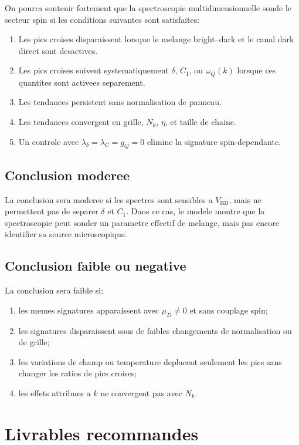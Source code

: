 \documentclass[11pt]{article}
\begin{document}
On pourra soutenir fortement que la spectroscopie multidimensionnelle sonde le secteur spin si les conditions suivantes sont satisfaites:
\begin{enumerate}
    \item Les pics croises disparaissent lorsque le melange bright--dark et le canal dark direct sont desactives.
    \item Les pics croises suivent systematiquement \(\delta\), \(C_1\), ou \(\omega_Q(k)\) lorsque ces quantites sont activees separement.
    \item Les tendances persistent sans normalisation de panneau.
    \item Les tendances convergent en grille, \(N_k\), \(\eta\), et taille de chaine.
    \item Un controle avec \(\lambda_\delta=\lambda_C=g_Q=0\) elimine la signature spin-dependante.
\end{enumerate}

\subsection{Conclusion moderee}

La conclusion sera moderee si les spectres sont sensibles a \(V_{\mathrm{BD}}\), mais ne permettent pas de separer \(\delta\) et \(C_1\). Dans ce cas, le modele montre que la spectroscopie peut sonder un parametre effectif de melange, mais pas encore identifier sa source microscopique.

\subsection{Conclusion faible ou negative}

La conclusion sera faible si:
\begin{enumerate}
    \item les memes signatures apparaissent avec \(\mu_D\neq0\) et sans couplage spin;
    \item les signatures disparaissent sous de faibles changements de normalisation ou de grille;
    \item les variations de champ ou temperature deplacent seulement les pics sans changer les ratios de pics croises;
    \item les effets attribues a \(k\) ne convergent pas avec \(N_k\).
\end{enumerate}

\section{Livrables recommandes}
\end{document}
